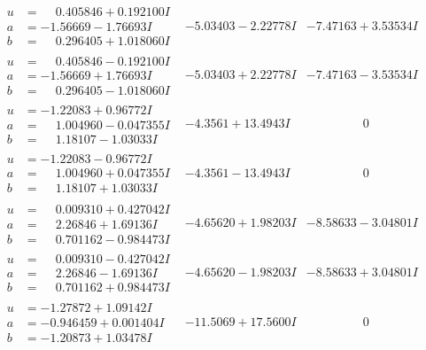 \documentclass[1p]{elsarticle_modified}
\theoremstyle{definition}
\begin{document}
$$\begin{array}{c|c|c}
\begin{aligned}
u &= \phantom{-}0.405846 + 0.192100 I \\
a &= -1.56669 - 1.76693 I \\
b &= \phantom{-}0.296405 + 1.018060 I\end{aligned}
 & -5.03403 - 2.22778 I & -7.47163 + 3.53534 I \\ \hline\begin{aligned}
u &= \phantom{-}0.405846 - 0.192100 I \\
a &= -1.56669 + 1.76693 I \\
b &= \phantom{-}0.296405 - 1.018060 I\end{aligned}
 & -5.03403 + 2.22778 I & -7.47163 - 3.53534 I \\ \hline\begin{aligned}
u &= -1.22083 + 0.96772 I \\
a &= \phantom{-}1.004960 - 0.047355 I \\
b &= \phantom{-}1.18107 - 1.03033 I\end{aligned}
 & -4.3561 + 13.4943 I & \phantom{-0.000000 } 0 \\ \hline\begin{aligned}
u &= -1.22083 - 0.96772 I \\
a &= \phantom{-}1.004960 + 0.047355 I \\
b &= \phantom{-}1.18107 + 1.03033 I\end{aligned}
 & -4.3561 - 13.4943 I & \phantom{-0.000000 } 0 \\ \hline\begin{aligned}
u &= \phantom{-}0.009310 + 0.427042 I \\
a &= \phantom{-}2.26846 + 1.69136 I \\
b &= \phantom{-}0.701162 - 0.984473 I\end{aligned}
 & -4.65620 + 1.98203 I & -8.58633 - 3.04801 I \\ \hline\begin{aligned}
u &= \phantom{-}0.009310 - 0.427042 I \\
a &= \phantom{-}2.26846 - 1.69136 I \\
b &= \phantom{-}0.701162 + 0.984473 I\end{aligned}
 & -4.65620 - 1.98203 I & -8.58633 + 3.04801 I \\ \hline\begin{aligned}
u &= -1.27872 + 1.09142 I \\
a &= -0.946459 + 0.001404 I \\
b &= -1.20873 + 1.03478 I\end{aligned}
 & -11.5069 + 17.5600 I & \phantom{-0.000000 } 0 \\ \hline\begin{aligned}

\end{aligned}
\end{array}$$
\end{document}
